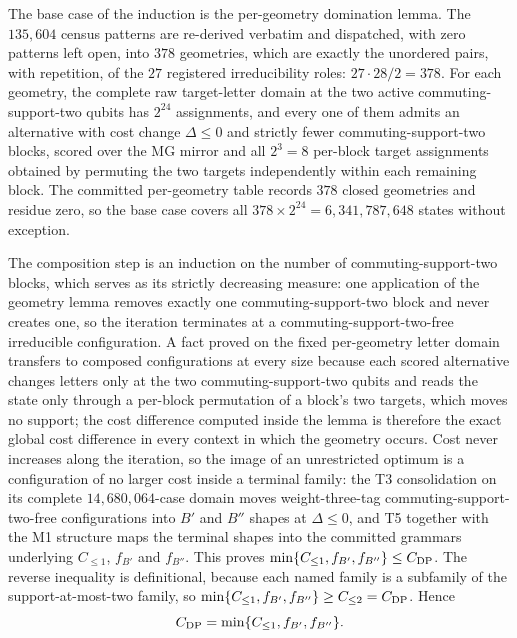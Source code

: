 \documentclass[a4paper,onecolumn,11pt,unpublished,noarxiv]{quantumarticle}
\begin{document}
The base case of the induction is the per-geometry domination lemma.  The $135{,}604$ census patterns are re-derived verbatim and dispatched, with zero patterns left open, into $378$ geometries, which are exactly the unordered pairs, with repetition, of the $27$ registered irreducibility roles: $27\cdot28/2=378$.  For each geometry, the complete raw target-letter domain at the two active commuting-support-two qubits has $2^{24}$ assignments, and every one of them admits an alternative with cost change $\Delta\le0$ and strictly fewer commuting-support-two blocks, scored over the MG mirror and all $2^3=8$ per-block target assignments obtained by permuting the two targets independently within each remaining block.  The committed per-geometry table records $378$ closed geometries and residue zero, so the base case covers all $378\times2^{24}=6{,}341{,}787{,}648$ states without exception.

The composition step is an induction on the number of commuting-support-two blocks, which serves as its strictly decreasing measure: one application of the geometry lemma removes exactly one commuting-support-two block and never creates one, so the iteration terminates at a commuting-support-two-free irreducible configuration.  A fact proved on the fixed per-geometry letter domain transfers to composed configurations at every size because each scored alternative changes letters only at the two commuting-support-two qubits and reads the state only through a per-block permutation of a block's two targets, which moves no support; the cost difference computed inside the lemma is therefore the exact global cost difference in every context in which the geometry occurs.  Cost never increases along the iteration, so the image of an unrestricted optimum is a configuration of no larger cost inside a terminal family: the T3 consolidation on its complete $14{,}680{,}064$-case domain moves weight-three-tag commuting-support-two-free configurations into $B'$ and $B''$ shapes at $\Delta\le0$, and T5 together with the M1 structure maps the terminal shapes into the committed grammars underlying $C_{\le1}$, $f_{B'}$ and $f_{B''}$.  This proves $\min\{C_{\le1},f_{B'},f_{B''}\}\le C_{\rm DP}$.  The reverse inequality is definitional, because each named family is a subfamily of the support-at-most-two family, so $\min\{C_{\le1},f_{B'},f_{B''}\}\ge C_{\le2}=C_{\rm DP}$.  Hence
\begin{equation}
C_{\rm DP}=\min\{C_{\le1},f_{B'},f_{B''}\}.
\end{equation}
\end{document}
